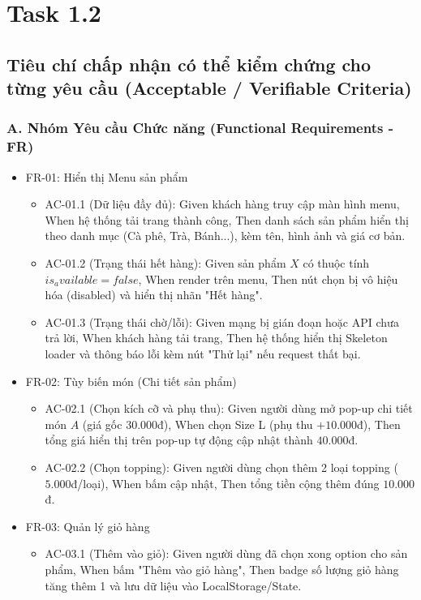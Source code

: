 \documentclass[english,12pt,a4paper]{book}
\begin{document}
	\section{Task 1.2}
	\subsection{Tiêu chí chấp nhận có thể kiểm chứng cho từng yêu cầu (Acceptable / Verifiable Criteria)}
	\subsubsection{A. Nhóm Yêu cầu Chức năng (Functional Requirements - FR)}
	\begin{itemize}[]
		\item FR-01: Hiển thị Menu sản phẩm
		\begin{itemize}[]
			\item AC-01.1 (Dữ liệu đầy đủ): Given khách hàng truy cập màn hình menu, When hệ thống tải trang thành công, Then danh sách sản phẩm hiển thị theo danh mục (Cà phê, Trà, Bánh...), kèm tên, hình ảnh và giá cơ bản.
			\item AC-01.2 (Trạng thái hết hàng): Given sản phẩm $X$ có thuộc tính $is_available = false$, When render trên menu, Then nút chọn bị vô hiệu hóa (disabled) và hiển thị nhãn "Hết hàng".
			\item AC-01.3 (Trạng thái chờ/lỗi): Given mạng bị gián đoạn hoặc API chưa trả lời, When khách hàng tải trang, Then hệ thống hiển thị Skeleton loader và thông báo lỗi kèm nút "Thử lại" nếu request thất bại.
		\end{itemize}
		\item FR-02: Tùy biến món (Chi tiết sản phẩm)
		\begin{itemize}[]
			\item AC-02.1 (Chọn kích cỡ và phụ thu): Given người dùng mở pop-up chi tiết món $A$ (giá gốc $30.000$đ), When chọn Size L (phụ thu $+10.000$đ), Then tổng giá hiển thị trên pop-up tự động cập nhật thành $40.000$đ.
			\item AC-02.2 (Chọn topping): Given người dùng chọn thêm 2 loại topping ($5.000$đ/loại), When bấm cập nhật, Then tổng tiền cộng thêm đúng $10.000$đ.
		\end{itemize}
		\item FR-03: Quản lý giỏ hàng
		\begin{itemize}[]
			\item AC-03.1 (Thêm vào giỏ): Given người dùng đã chọn xong option cho sản phẩm, When bấm "Thêm vào giỏ hàng", Then badge số lượng giỏ hàng tăng thêm 1 và lưu dữ liệu vào LocalStorage/State.

\end{itemize}
\end{itemize}
\end{document}
